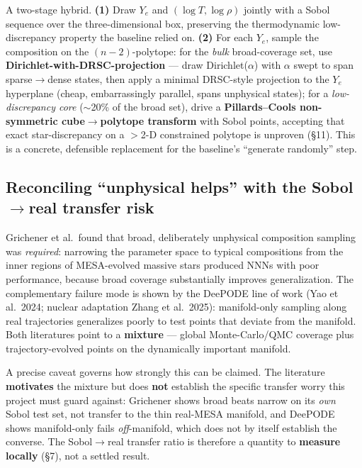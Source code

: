 \documentclass[11pt]{article}
\begin{document}
A two-stage hybrid. \textbf{(1)} Draw $Y_e$ and $(\log T, \log \rho)$ jointly with a Sobol sequence over the three-dimensional box, preserving the thermodynamic low-discrepancy property the baseline relied on. \textbf{(2)} For each $Y_e$, sample the composition on the $(n-2)$-polytope: for the \emph{bulk} broad-coverage set, use \textbf{Dirichlet-with-DRSC-projection} --- draw Dirichlet($\alpha$) with $\alpha$ swept to span sparse$\to$dense states, then apply a minimal DRSC-style projection to the $Y_e$ hyperplane (cheap, embarrassingly parallel, spans unphysical states); for a \emph{low-discrepancy core} ($\sim$20\% of the broad set), drive a \textbf{Pillards--Cools non-symmetric cube$\to$polytope transform} with Sobol points, accepting that exact star-discrepancy on a $>$2-D constrained polytope is unproven (\S11). This is a concrete, defensible replacement for the baseline's ``generate randomly'' step.

\subsection{Reconciling ``unphysical helps'' with the Sobol\texorpdfstring{$\to$}{->}real transfer risk}

Grichener et al.\ found that broad, deliberately unphysical composition sampling was \emph{required}: narrowing the parameter space to typical compositions from the inner regions of MESA-evolved massive stars produced NNNs with poor performance, because broad coverage substantially improves generalization. The complementary failure mode is shown by the DeePODE line of work (Yao et al.\ 2024; nuclear adaptation Zhang et al.\ 2025): manifold-only sampling along real trajectories generalizes poorly to test points that deviate from the manifold. Both literatures point to a \textbf{mixture} --- global Monte-Carlo/QMC coverage plus trajectory-evolved points on the dynamically important manifold.

A precise caveat governs how strongly this can be claimed. The literature \textbf{motivates} the mixture but does \textbf{not} establish the specific transfer worry this project must guard against: Grichener shows broad beats narrow on its \emph{own} Sobol test set, not transfer to the thin real-MESA manifold, and DeePODE shows manifold-only fails \emph{off}-manifold, which does not by itself establish the converse. The Sobol$\to$real transfer ratio is therefore a quantity to \textbf{measure locally} (\S7), not a settled result.
\end{document}
